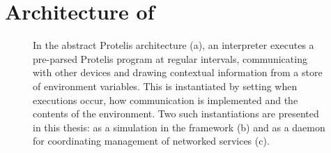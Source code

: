 \documentclass[12pt,a4paper,twoside,openright]{book}
\begin{document}
\section{Architecture of \protelis{}}
\label{protelis-architecture}
\begin{figure}
\centering
{}
\caption{In the abstract Protelis architecture (a), an interpreter executes a pre-parsed Protelis program at regular intervals, communicating with other devices and drawing contextual information from a store of environment variables.
%
This is instantiated by setting when executions occur, how communication is implemented and the contents of the environment.
%
Two such instantiations are presented in this thesis: as a simulation in the \alchemist{} framework (b) and as a daemon for coordinating management of networked services (c).}
\label{img:protelis-architecture}
\end{figure}
\end{document}
